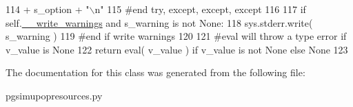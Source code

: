 \begin{DoxyCode}
114                     + s\_option + \textcolor{stringliteral}{"\(\backslash\)n"} 
115         \textcolor{comment}{#end try, except, except, except}
116 
117         \textcolor{keywordflow}{if} self.\hyperlink{classnegui_1_1pgsimupopresources_1_1PGSimuPopResources_ae4805ab6ba55817bc2e40fd622d76483}{\_\_write\_warnings} \textcolor{keywordflow}{and} s\_warning \textcolor{keywordflow}{is} \textcolor{keywordflow}{not} \textcolor{keywordtype}{None}:
118             sys.stderr.write( s\_warning )
119         \textcolor{comment}{#end if write warnings }
120 
121         \textcolor{comment}{#eval will throw a type error if v\_value is None}
122         \textcolor{keywordflow}{return} eval( v\_value ) \textcolor{keywordflow}{if} v\_value \textcolor{keywordflow}{is} \textcolor{keywordflow}{not} \textcolor{keywordtype}{None} \textcolor{keywordflow}{else} \textcolor{keywordtype}{None}
123 
\end{DoxyCode}


The documentation for this class was generated from the following file\+:\begin{DoxyCompactItemize}
\item 
pgsimupopresources.\+py\end{DoxyCompactItemize}
